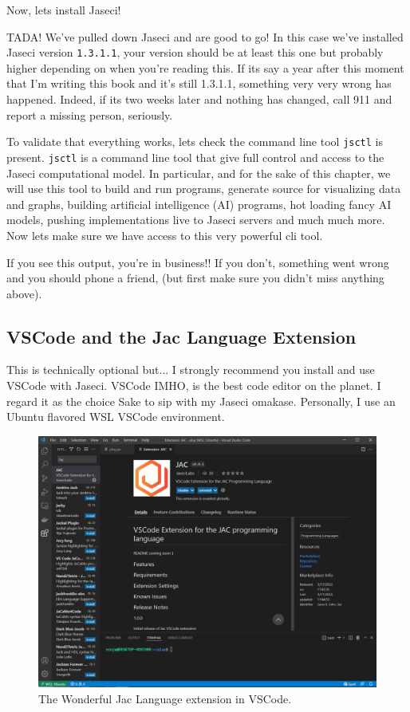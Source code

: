 Now, lets install Jaseci!
\par
{}

TADA! We've pulled down Jaseci and are good to go! In this case we've installed Jaseci version \texttt{1.3.1.1}, your version should be at least this one but probably higher depending on when you're reading this. If its say a year after this moment that I'm writing this book and it's still 1.3.1.1, something very very wrong has happened. Indeed, if its two weeks later and nothing has changed, call 911 and report a missing person, seriously.

To validate that everything works, lets check the command line tool \texttt{jsctl} is present. \texttt{jsctl} is a command line tool that give full control and access to the Jaseci computational model. In particular, and for the sake of this chapter, we will use this tool to build and run programs, generate source for visualizing data and graphs, building artificial intelligence (AI) programs, hot loading fancy AI models, pushing implementations live to Jaseci servers and much much more. Now lets make sure we have access to this very powerful cli tool.

\par
{}

If you see this output, you're in business!! If you don't, something went wrong and you should phone a friend, (but first make sure you didn't miss anything above).

\subsection{VSCode and the Jac Language Extension}

This is technically optional but... I strongly recommend you install and use VSCode with Jaseci. VSCode \gls{IMHO}, is the best code editor on the planet. I regard it as the choice Sake to sip with my Jaseci omakase. Personally, I use an Ubuntu flavored \gls{WSL} VSCode environment.

\begin{figure}
    \centering
    \includegraphics[width=.7\linewidth]{assets/images/vscode_jac_plugin.png}
    \caption[]{The Wonderful Jac Language extension in VSCode.}
    \label{fig:vscode_jac}
\end{figure}

